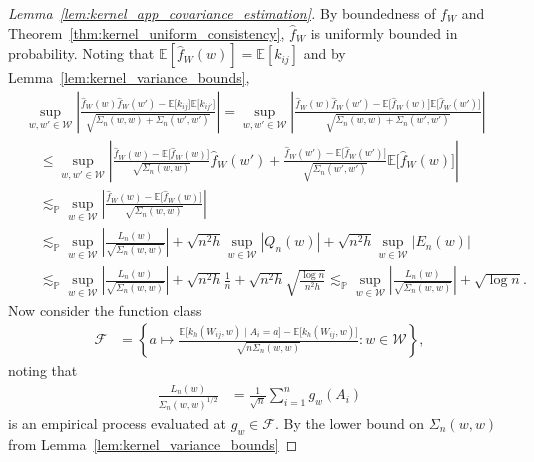 \documentclass[11pt,lof]{puthesis}
\renewcommand{\P}{\ensuremath{\mathbb{P}}}
\newcommand{\E}{\ensuremath{\mathbb{E}}}
\newcommand{\cF}{\ensuremath{\mathcal{F}}}
\newcommand{\cW}{\ensuremath{\mathcal{W}}}
\theoremstyle{break}
\theoremstyle{proof}
\newtheorem{proof}{Proof}
\begin{document}
\begin{proof}[Lemma~\ref{lem:kernel_app_covariance_estimation}]
  By boundedness of $f_W$ and
  Theorem~\ref{thm:kernel_uniform_consistency},
  $\hat f_W$ is uniformly bounded in probability.
  Noting that
  $\E[\hat f_W(w)] = \E[k_{i j}]$
  and by Lemma~\ref{lem:kernel_variance_bounds},
  \begin{align*}
    &\sup_{w,w' \in \cW}
    \left|
      \frac{
        \hat f_W(w) \hat f_W(w')
      - \E\big[k_{i j}\big] \E\big[k_{i j'}\big]}
      {\sqrt{\Sigma_n(w,w) + \Sigma_n(w',w')}}
    \right|
    =
    \sup_{w,w' \in \cW}
    \left|
      \frac{
        \hat f_W(w) \hat f_W(w')
      - \E\big[\hat f_W(w)\big] \E\big[\hat f_W(w')\big]}
      {\sqrt{\Sigma_n(w,w) + \Sigma_n(w',w')}}
    \right| \\
    &\quad\leq
    \sup_{w,w' \in \cW}
    \left|
      \frac{\hat f_W(w) - \E\big[\hat f_W(w)\big]}
      {\sqrt{\Sigma_n(w,w)}}
      \hat f_W(w')
      + \frac{\hat f_W(w') - \E\big[\hat f_W(w')\big]}
      {\sqrt{\Sigma_n(w',w')}}
      \E\big[\hat f_W(w)]
    \right| \\
    &\quad\lesssim_\P
    \sup_{w \in \cW}
    \left|
      \frac{\hat f_W(w) - \E\big[\hat f_W(w)\big]}
      {\sqrt{\Sigma_n(w,w)}}
    \right| \\
    &\quad\lesssim_\P
    \sup_{w \in \cW}
    \left|
      \frac{L_n(w)}
      {\sqrt{\Sigma_n(w,w)}}
    \right|
    + \sqrt{n^2h} \sup_{w \in \cW} \left| Q_n(w) \right|
    + \sqrt{n^2h} \sup_{w \in \cW} \left| E_n(w) \right| \\
    &\quad\lesssim_\P
    \sup_{w \in \cW}
    \left|
      \frac{L_n(w)}
      {\sqrt{\Sigma_n(w,w)}}
    \right|
    + \sqrt{n^2h} \frac{1}{n}
    + \sqrt{n^2h} \sqrt{\frac{\log n}{n^2h}}
    \lesssim_\P
    \sup_{w \in \cW}
    \left|
      \frac{L_n(w)}
      {\sqrt{\Sigma_n(w,w)}}
    \right|
    + \sqrt{\log n}.
  \end{align*}
  Now consider the function class
  \begin{align*}
    \cF
    &=
    \left\{
      a \mapsto
      \frac{
        \E\big[k_h(W_{i j},w) \mid A_i = a \big]
      - \E\big[k_h(W_{i j},w) \big]}
      {\sqrt{n \Sigma_n(w,w)}}:
      w \in \cW
    \right\},
  \end{align*}
  noting that
  \begin{align*}
    \frac{L_n(w)}
    {\Sigma_n(w,w)^{1/2}}
    &=
    \frac{1}{\sqrt n}
    \sum_{i=1}^n
    g_w(A_i)
  \end{align*}
  is an empirical process evaluated at
  $g_w \in \cF$.
  By the lower bound on $\Sigma_n(w,w)$
  from Lemma~\ref{lem:kernel_variance_bounds}

\end{proof}
\end{document}
